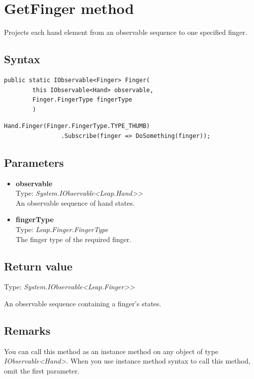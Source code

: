 \documentclass[12pt,a4paper,twoside]{report}
\begin{document}
\newpage

\section{GetFinger method}
Projects each hand element from an observable sequence to one specified finger.

\subsection{Syntax}
\begin{lstlisting}[caption=Declaration]
     public static IObservable<Finger> Finger(
        this IObservable<Hand> observable,
        Finger.FingerType fingerType
        )
\end{lstlisting}

\begin{lstlisting}[caption=Usage example]
     Hand.Finger(Finger.FingerType.TYPE_THUMB)
                .Subscribe(finger => DoSomething(finger));
\end{lstlisting}

\subsection{Parameters}
\begin{itemize}
    \item \textbf{observable}\\
        Type: \textit{System.IObservable<Leap.Hand>{}>}\\
        An observable sequence of hand states.
    \item \textbf{fingerType}\\
        Type: \textit{Leap.Finger.FingerType}\\
        The finger type of the required finger.
\end{itemize}

\subsection{Return value}
Type: \textit{System.IObservable<Leap.Finger>{}>}

An observable sequence containing a finger's states.

\subsection{Remarks}
You can call this method as an instance method on any object of type \textit{IObservable<Hand>}. When you use 
instance method syntax to call this method, omit the first parameter.
\end{document}
